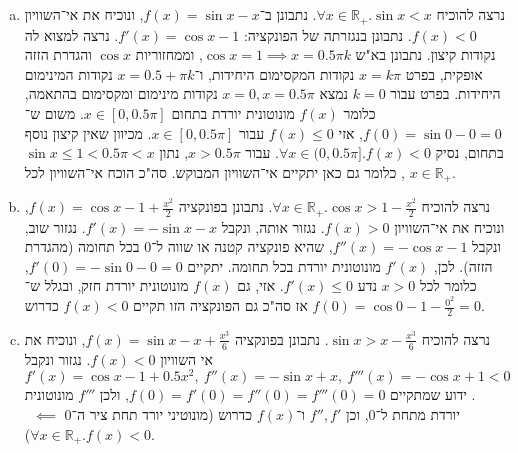 \documentclass[]{article}
\newcommand\R     {\mathbb{R}}
\newcommand\cosx  {\cos x}
\newcommand\sinx  {\sin x}
\newcommand\hence     {$\!\!\impliedby\!\!$}
\begin{document}
	\section{}
	\begin{enumerate}[a)]
		\item נרצה להוכיח $\forall x \in \R_+. \sin x < x$. נתבונן ב־$f(x) = \sinx - x$, ונוכיח את אי־השוויון $f(x) < 0$. נתבונן בנגזרתה של הפונקציה: $f'(x) = \cosx - 1$. נרצה למצוא לה נקודות קיצון. נתבונן בא"ש $\cosx = 1 \implies x = 0.5\pi k$, וממחזוריות $\cosx$ והגדרת הזזה אופקית, בפרט $x = k \pi $ נקודות המקסימום היחידות, ו־$x = 0.5 + \pi k$ נקודות המינימום היחידות. בפרט עבור $k = 0$ נמצא $x = 0, x = 0.5\pi$ נקודות מינימום ומקסימום בהתאמה, כלומר $f(x)$ מונוטונית יורדת בתחום $x \in [0, 0.5\pi]$. משום ש־$f(0) = \sin 0 - 0 = 0$, אזי $f(x) \le 0$ עבור $x \in [0, 0.5\pi]$. מכיוון שאין קיצון נוסף בתחום, נסיק $\forall x \in (0, 0.5\pi]. f(x) < 0$. עבור $x > 0.5\pi$, נתון $\sin x \le 1 < 0.5 \pi < x$, כלומר גם כאן יתקיים אי־השוויון המבוקש. סה"כ הוכח אי־השוויון לכל $x \in \R_+$. 
		\item נרצה להוכיח $\forall x \in \R_+. \cosx > 1 - \frac{x^2}{2}$. נתבונן בפונקציה $f(x) = \cosx -1 + \frac{x^2}{2}$, ונוכיח את אי־השוויון $f(x) > 0$. נגזור אותה, ונקבל $f'(x) = -\sinx - x$. נגזור שוב, ונקבל $f''(x) = -\cosx - 1$, שהיא פונקציה קטנה או שווה ל־$0$ בכל תחומה (מהגדרת הזזה). לכן, $f'(x)$ מונוטונית יורדת בכל תחומה. יתקיים $f'(0) = -\sin 0 - 0 = 0$, כלומר לכל $x > 0$ נדע $f'(x) \le 0$. אזי, גם $f(x)$ מונוטונית יורדת חזק, ובגלל ש־$f(0) = \cos0 - 1 - \frac{0^2}{2} = 0$ אז סה"כ גם הפונקציה הזו תקיים $f(x) < 0$ כדרוש. 
		\item נרצה להוכיח $\sinx > x - \frac{x^3}{6}$. נתבונן בפונקציה $f(x) = \sinx - x + \frac{x^3}{6}$, ונוכיח את אי השוויון $f(x) < 0$. נגזור ונקבל $f'(x) = \cosx - 1 + 0.5x^2, \ f''(x) = -\sinx + x, \ f'''(x) = -\cosx + 1 < 0$. ידוע שמתקיים $f(0) = f'(0) = f''(0) = f'''(0) = 0$, ולכן $f'''$ מונוטונית יורדת מתחת ל־$0$, וכן $f'', f'$ ו־$f(x)$ כדרוש (מונוטיני יורד תחת ציר ה־$0$ \hence \ $\forall x \in \R_+. f(x) < 0$). 
	\end{enumerate}
	
\end{document}
